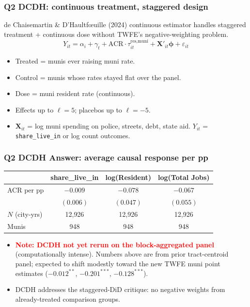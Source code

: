 \documentclass[xcolor = x11names, compress, aspectratio = 169]{beamer}
\renewcommand{\(}{\begin{columns}}
\renewcommand{\)}{\end{columns}}
\newcommand{\<}[1]{\begin{column}{#1}}
\renewcommand{\>}{\end{column}}
\begin{document}
\begin{frame}
\frametitle{Q2 DCDH: continuous treatment, staggered design}
    de Chaisemartin \& D'Haultf{\oe}uille (2024) continuous estimator
    handles staggered treatment + continuous dose without TWFE's
    negative-weighting problem.
    \[
    Y_{it} = \alpha_i + \gamma_t + \text{ACR} \cdot \tau^{\text{res,muni}}_{it} + \mathbf{X}'_{it}\boldsymbol{\phi} + \varepsilon_{it}
    \]
    \footnotesize
    \begin{itemize}
        \item Treated = munis ever raising muni rate.
        \item Control = munis whose rates stayed flat over the panel.
        \item Dose = muni resident rate (continuous).
        \item Effects up to $\ell = 5$; placebos up to $\ell = -5$.
        \item $\mathbf{X}_{it}$ = log muni spending on police, streets,
        debt, state aid. $Y_{it}$ = \texttt{share\_live\_in} or log count
        outcomes.
    \end{itemize}
\end{frame}

\begin{frame}
\frametitle{Q2 DCDH Answer: average causal response per pp}
    \centering
    \small
    \begin{tabular}{lccc}
        \toprule
        & share\_live\_in & log(Resident) & log(Total Jobs) \\
        \midrule
        ACR per pp & $-0.009$ & $-0.078$ & $-0.067$ \\
                    & $(0.006)$ & $(0.047)$ & $(0.055)$ \\
        \midrule
        $N$ (city-yrs) & 12{,}926 & 12{,}926 & 12{,}926 \\
        Munis           & 948 & 948 & 948 \\
        \bottomrule
    \end{tabular}
    \vspace{0.1cm}
    \begin{itemize}\setlength{\itemsep}{0.04cm}\small
        \item \textcolor{red}{\textbf{Note: DCDH not yet rerun on the
        block-aggregated panel}} (computationally intense). Numbers above
        are from prior tract-centroid panel; expected to shift modestly
        toward the new TWFE muni point estimates ($-0.012^{**}$,
        $-0.201^{***}$, $-0.128^{***}$).
        \item DCDH addresses the staggered-DiD critique: no negative
        weights from already-treated comparison groups.
    \end{itemize}
\end{frame}
\end{document}
